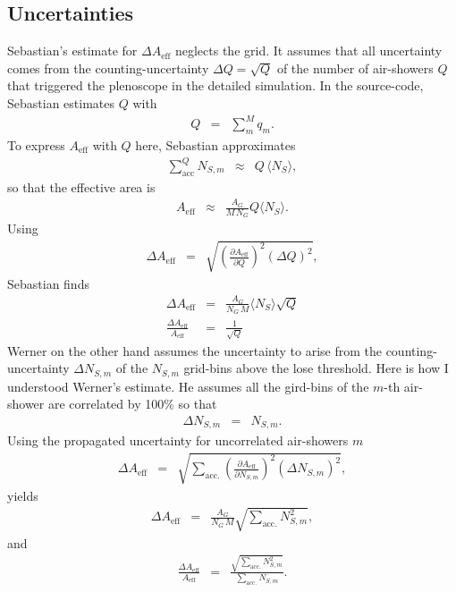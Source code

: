 \documentclass[a4paper,12pt,oneside]{article}
\begin{document}
\subsection*{Uncertainties}
%
Sebastian's estimate for $\Delta A_\text{eff}$ neglects the grid.
%
It assumes that all uncertainty comes from the counting-uncertainty $\Delta Q = \sqrt{Q}$ of the number of air-showers $Q$ that triggered the plenoscope in the detailed simulation.
%
In the source-code, Sebastian estimates $Q$ with
%
\begin{eqnarray*}
Q &=& \sum_m^M q_m.
\end{eqnarray*}
%
To express $A_\text{eff}$ with $Q$ here, Sebastian approximates
%
\begin{eqnarray*}
\sum_\text{acc}^Q N_{S,m} &\approx& Q\,\langle N_S \rangle,
\end{eqnarray*}
%
so that the effective area is
%
\begin{eqnarray*}
A_\text{eff} &\approx& \frac{A_G}{M\,N_G} Q \langle N_{S} \rangle.
\end{eqnarray*}
%
Using
%
\begin{eqnarray*}
\Delta A_\text{eff} &=& \sqrt{\left(\frac{\partial A_\text{eff}}{\partial Q}\right)^2(\Delta Q)^2},
\end{eqnarray*}
%
Sebastian finds
%
\begin{eqnarray*}
\Delta A_\text{eff} &=& \frac{A_G}{N_G\,M} \langle N_S \rangle \sqrt{Q}\\
%
\frac{\Delta A_\text{eff}}{A_\text{eff}} &=& \frac{1}{\sqrt{Q}}
\end{eqnarray*}
%
Werner on the other hand assumes the uncertainty to arise from the counting-uncertainty  $\Delta N_{S,m}$ of the $N_{S,m}$ grid-bins above the lose threshold.
%
Here is how I understood Werner's estimate.
%
He assumes all the gird-bins of the $m$-th air-shower are correlated by 100\% so that
%
\begin{eqnarray*}
\Delta N_{S,m} &=& N_{S,m}.
\end{eqnarray*}
%
Using the propagated uncertainty for uncorrelated air-showers $m$
%
\begin{eqnarray*}
\Delta A_\text{eff} &=& \sqrt{\sum_\text{acc.} \left(\frac{\partial A_\text{eff}}{\partial N_{S,m}}\right)^2(\Delta N_{S,m})^2},
\end{eqnarray*}
%
yields
%
\begin{eqnarray*}
\Delta A_\text{eff} &=& \frac{A_G}{N_G\,M} \sqrt{\sum_\text{acc.}N_{S,m}^2},
\end{eqnarray*}
%
and
%
\begin{eqnarray*}
\frac{\Delta A_\text{eff}}{A_\text{eff}} &=& \frac{\sqrt{\sum_\text{acc.}N_{S,m}^2}}{\sum_\text{acc.}N_{S,m}}.
\end{eqnarray*}
\end{document}
